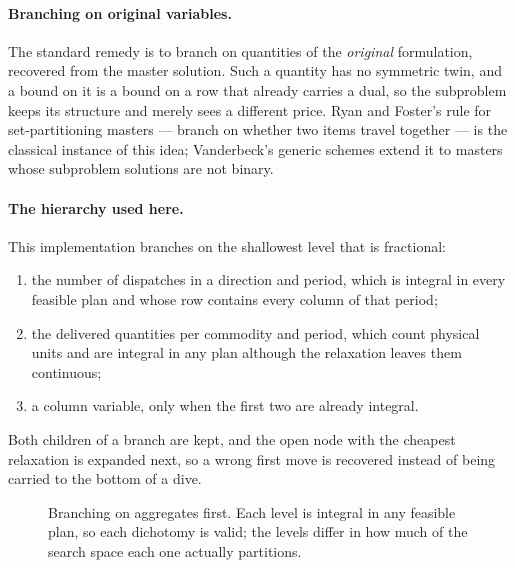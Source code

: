 \documentclass[11pt,a4paper]{article}
\begin{document}
\paragraph{Branching on original variables.} The standard remedy is to branch on
quantities of the \emph{original} formulation, recovered from the master
solution. Such a quantity has no symmetric twin, and a bound on it is a bound on
a row that already carries a dual, so the subproblem keeps its structure and
merely sees a different price. Ryan and Foster's rule for set-partitioning
masters --- branch on whether two items travel together --- is the classical
instance of this idea; Vanderbeck's generic schemes extend it to masters whose
subproblem solutions are not binary.

\paragraph{The hierarchy used here.} This implementation branches on the
shallowest level that is fractional:
\begin{enumerate}[leftmargin=1.6em]
\item the number of dispatches in a direction and period, which is integral in
every feasible plan and whose row contains every column of that period;
\item the delivered quantities per commodity and period, which count physical
units and are integral in any plan although the relaxation leaves them
continuous;
\item a column variable, only when the first two are already integral.
\end{enumerate}
Both children of a branch are kept, and the open node with the cheapest
relaxation is expanded next, so a wrong first move is recovered instead of being
carried to the bottom of a dive.

\begin{figure}[h!]
\centering
{}
\caption{Branching on aggregates first. Each level is integral in any feasible
plan, so each dichotomy is valid; the levels differ in how much of the search
space each one actually partitions.}
\end{figure}
\end{document}
